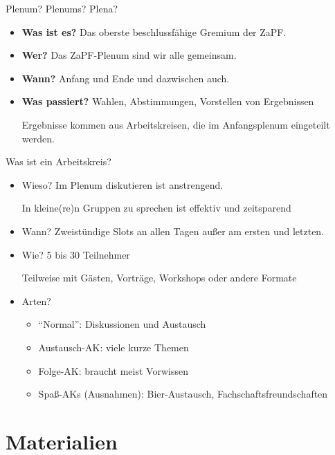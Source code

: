\documentclass[compress,]{beamer}
\begin{document}
\begin{frame}{Plenum? Plenums? Plena?}

  \begin{itemize}
  \item<1-> \textbf{Was ist es?} Das oberste beschlussfähige Gremium der ZaPF.
  \item<2-> \textbf{Wer?} Das ZaPF-Plenum sind wir alle gemeinsam.
  \item<3-> \textbf{Wann?} Anfang und Ende und dazwischen auch.
  \item<4-> \textbf{Was passiert?} Wahlen, Abstimmungen, Vorstellen von Ergebnissen

    Ergebnisse kommen aus Arbeitskreisen, die im Anfangsplenum eingeteilt werden.
  \end{itemize}


\end{frame}

\begin{frame}{Was ist ein Arbeitskreis?}

  \begin{itemize}
  \item<1-> Wieso? Im Plenum diskutieren ist anstrengend.

    In kleine(re)n Gruppen zu sprechen ist effektiv und zeitsparend
  \item<2-> Wann? Zweistündige Slots an allen Tagen außer am ersten und letzten.
  \item<3-> Wie? 5 bis 30 Teilnehmer

    Teilweise mit Gästen, Vorträge, Workshops oder andere Formate
  \item<4-> Arten?
    \begin{itemize}
    \item<5-> ``Normal'': Diskussionen und Austausch
    \item<6-> Austausch-AK: viele kurze Themen
    \item<7-> Folge-AK: braucht meist Vorwissen
    \item<8-> Spaß-AKs (Ausnahmen): Bier-Austausch, Fachschaftsfreundschaften
    \end{itemize}
  \end{itemize}

\end{frame}


\section{Materialien}
\end{document}
